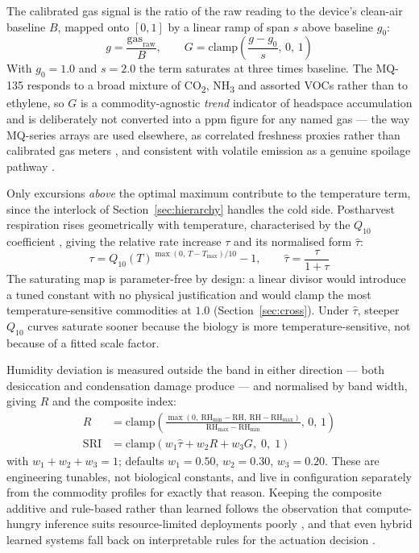 \documentclass[conference]{IEEEtran}
\begin{document}
The calibrated gas signal is the ratio of the raw reading to the device's
clean-air baseline $B$, mapped onto $[0,1]$ by a linear ramp of span $s$
above baseline $g_0$:
\begin{equation}
g = \frac{\text{gas}_{\text{raw}}}{B}, \qquad
G = \mathrm{clamp}\!\left(\frac{g - g_0}{s},\, 0,\, 1\right)
\end{equation}
With $g_0 = 1.0$ and $s = 2.0$ the term saturates at three times baseline.
The MQ-135 responds to a broad mixture of CO\textsubscript{2},
NH\textsubscript{3} and assorted VOCs rather than to ethylene, so $G$ is a
commodity-agnostic \emph{trend} indicator of headspace accumulation and is
deliberately not converted into a ppm figure for any named gas --- the way
MQ-series arrays are used elsewhere, as correlated freshness proxies
rather than calibrated gas meters
\cite{trebar2024,rahman2024,bhattacharjee2025}, and consistent with
volatile emission as a genuine spoilage pathway \cite{andre2024}.

Only excursions \emph{above} the optimal maximum contribute to the
temperature term, since the interlock of Section~\ref{sec:hierarchy}
handles the cold side. Postharvest respiration rises geometrically with
temperature, characterised by the $Q_{10}$ coefficient \cite{ah66}, giving
the relative rate increase $\tau$ and its normalised form $\hat{\tau}$:
\begin{equation}
\tau = Q_{10}(T)^{\max(0,\,T - T_{\max})/10} - 1, \qquad
\hat{\tau} = \frac{\tau}{1 + \tau}
\end{equation}
The saturating map is parameter-free by design: a linear divisor would
introduce a tuned constant with no physical justification and would clamp
the most temperature-sensitive commodities at $1.0$
(Section~\ref{sec:cross}). Under $\hat{\tau}$, steeper $Q_{10}$ curves
saturate sooner because the biology is more temperature-sensitive, not
because of a fitted scale factor.

Humidity deviation is measured outside the band in either direction ---
both desiccation and condensation damage produce --- and normalised by
band width, giving $R$ and the composite index:
\begin{equation}
\begin{aligned}
R &= \mathrm{clamp}\!\left(\tfrac{\max(0,\ \text{RH}_{\min}-\text{RH},\ \text{RH}-\text{RH}_{\max})}{\text{RH}_{\max} - \text{RH}_{\min}},\, 0,\, 1\right)\\[2pt]
\text{SRI} &= \mathrm{clamp}\!\left(w_1\hat{\tau} + w_2 R + w_3 G,\; 0,\; 1\right)
\end{aligned}
\label{eq:sri}
\end{equation}
with $w_1 + w_2 + w_3 = 1$; defaults $w_1 = 0.50$, $w_2 = 0.30$,
$w_3 = 0.20$. These are engineering tunables, not biological constants,
and live in configuration separately from the commodity profiles for
exactly that reason. Keeping the composite additive and rule-based rather
than learned follows the observation that compute-hungry inference suits
resource-limited deployments poorly \cite{rashvand2025,heydari2025}, and
that even hybrid learned systems fall back on interpretable rules for the
actuation decision \cite{singh2025}.
\end{document}
